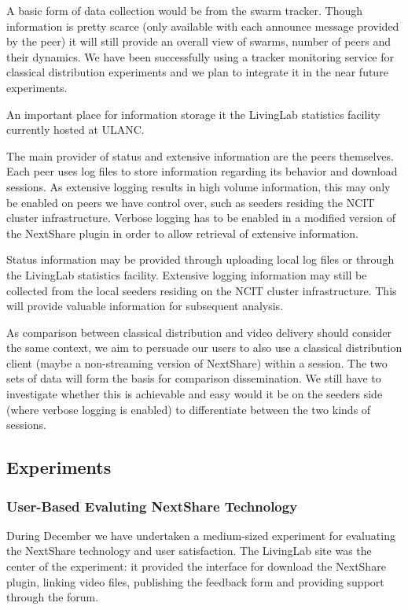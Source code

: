A basic form of data collection would be from the swarm tracker. Though
information is pretty scarce (only available with each announce message
provided by the peer) it will still provide an overall view of swarms, number
of peers and their dynamics. We have been successfully using a tracker
monitoring service for classical distribution experiments and we plan to
integrate it in the near future experiments.

An important place for information storage it the LivingLab statistics
facility currently hosted at ULANC.

The main provider of status and extensive information are the peers
themselves. Each peer uses log files to store information regarding its
behavior and download sessions. As extensive logging results in high volume
information, this may only be enabled on peers we have control over, such as
seeders residing the NCIT cluster infrastructure. Verbose logging has to be
enabled in a modified version of the NextShare plugin in order to allow
retrieval of extensive information.

Status information may be provided through uploading local log files or
through the LivingLab statistics facility. Extensive logging information may
still be collected from the local seeders residing on the NCIT cluster
infrastructure. This will provide valuable information for subsequent
analysis.

As comparison between classical distribution and video delivery should
consider the same context, we aim to persuade our users to also use a
classical distribution client (maybe a non-streaming version of NextShare)
within a session. The two sets of data will form the basis for comparison
dissemination. We still have to investigate whether this is achievable and
easy would it be on the seeders side (where verbose logging is enabled) to
differentiate between the two kinds of sessions.

\subsection{Experiments}
\label{subsec:multimedia-dist:evaluation-december-2010}

\subsubsection{User-Based Evaluting NextShare Technology}

During December we have undertaken a
medium-sized experiment for evaluating the NextShare technology and user
satisfaction. The LivingLab site was the center of the experiment: it
provided the interface for download the NextShare plugin, linking video files,
publishing the feedback form and providing support through the forum.

